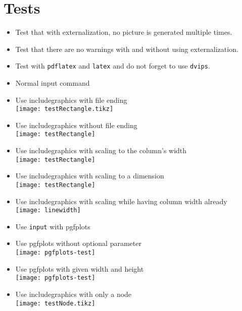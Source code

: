\documentclass[twocolumn]{article}
\begin{document}
	\section*{Tests}
	\begin{itemize}
		\item Test that with externalization, no picture is generated multiple times.
		\item Test that there are no warnings with and without using externalization.
		\item Test with \texttt{pdflatex} and \texttt{latex} and do not forget to use \texttt{dvips}.
		\item Normal input command\\%
		\item Use includegraphics with file ending\\%
			\texttt{[image: testRectangle.tikz]}%
		\item Use includegraphics without file ending\\%
			\texttt{[image: testRectangle]}%
		\item Use includegraphics with scaling to the column's width\\%
			\texttt{[image: testRectangle]}%
		\item Use includegraphics with scaling to a dimension\\%
			\texttt{[image: testRectangle]}%
		\item Use includegraphics with scaling while having column width already\\%
			\texttt{[image: linewidth]}%
		\item Use \texttt{input} with pgfplots\\%
		\item Use pgfplots without optional parameter\\%
			\texttt{[image: pgfplots-test]}%
		\item Use pgfplots with given width and height\\%
			\texttt{[image: pgfplots-test]}%
		\item Use includegraphics with only a node\\%
			\texttt{[image: testNode.tikz]}%
		\ifpdf

\end{itemize}
\end{document}
